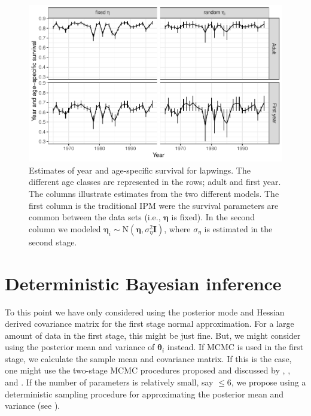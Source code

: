 \documentclass[12pt]{article}
\newcommand{\bt}{\boldsymbol{\theta}}
\newcommand{\bn}{\boldsymbol{\eta}}
\newcommand{\tN}{\text{N}}
\newcommand{\bI}{\mathbf{I}}
\begin{document}
\begin{figure}
\includegraphics[width=6.5in]{survival} 
\caption{\label{fig:surv}Estimates of year and age-specific survival for lapwings. The different age classes are represented in the rows; adult and first year. The columns illustrate estimates from the two different models. The first column is the traditional IPM were the survival parameters are common between the data sets (i.e., $\bn$ is fixed). In the second column we modeled $\bn_i \sim \tN(\bn, \sigma_{\eta}^2\bI)$, where $\sigma_{\eta}$ is estimated in the second stage.}
\end{figure}

\clearpage

\appendix

\section{Deterministic Bayesian inference} 
\label{sec:methodii}

To this point we have only considered using the posterior mode and Hessian derived covariance matrix for the first stage normal approximation. For a large amount of data in the first stage, this might be just fine. But, we might consider using the posterior mean and variance of $\bt_i$ instead. If MCMC is used in the first stage, we  calculate the sample mean and covariance matrix. If this is the case, one might use the two-stage MCMC procedures proposed and discussed by \cite{lunn2013fully}, \cite{hooten2018prior}, and \cite{goudie2019joining}. If the number of parameters is relatively small, say $\le 6$, we propose using a deterministic sampling procedure for approximating the posterior mean and variance (see \citealt{johnson2011bayesian}). 
\end{document}
